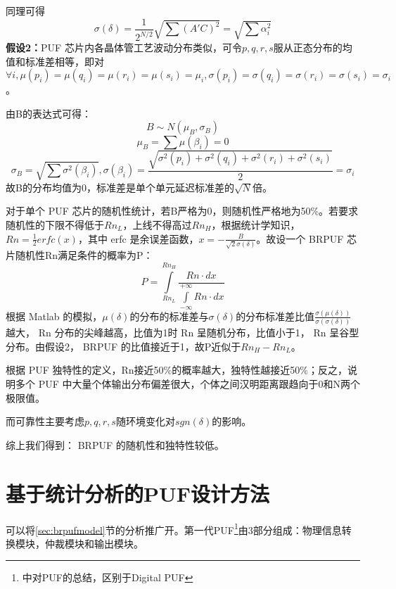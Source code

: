 同理可得
\begin{equation}
\sigma(\delta)=\frac{1}{2^{N/2}}\sqrt{\sum(A'C)^2}=\sqrt{\sum\alpha_i^2}
\end{equation}
\textbf{假设2：}PUF 芯片内各晶体管工艺波动分布类似，可令$ p,q,r,s $服从正态分布的均值和标准差相等，即对$ \forall i,\mu(p_i )=\mu(q_i )=\mu(r_i )=\mu(s_i )=\mu_i,\sigma(p_i )=\sigma(q_i )=\sigma(r_i )=\sigma(s_i )=\sigma_i $。

由B的表达式可得：
\begin{equation}
B\sim N(\mu_B,\sigma_B)
\end{equation}
\begin{equation}
\mu_B=\sum\mu(\beta_i)=0
\end{equation}
\begin{equation}
\sigma_B=\sqrt{\sum\sigma^2(\beta_i)},\sigma(\beta_i)=\dfrac{\sqrt{\sigma^2(p_i)+\sigma^2(q_i)+\sigma^2(r_i)+\sigma^2(s_i)}}{2}=\sigma_i
\end{equation}
故B的分布均值为0，标准差是单个单元延迟标准差的$ \sqrt{N} $倍。

对于单个 PUF 芯片的随机性统计，若B严格为0，则随机性严格地为50\%。若要求随机性的下限不得低于$ Rn_L $，上线不得高过$ Rn_H $，根据统计学知识，$ Rn=\frac{1}{2}erfc(x) $，其中 erfc 是余误差函数，$ x=-\frac{B}{\sqrt{2}\sigma(\delta)} $。故设一个 BRPUF 芯片随机性Rn满足条件的概率为P：
\begin{equation}
P=\int\limits_{Rn_L}^{Rn_H}\dfrac{Rn\cdot dx}{\int\limits_{-\infty}^{+\infty}Rn\cdot dx}
\end{equation}
根据 Matlab 的模拟，$ \mu(\delta) $的分布的标准差与$ \sigma(\delta) $的分布标准差比值$ \frac{\sigma(\mu(\delta))}{\sigma(\sigma(\delta))} $ 越大， Rn 分布的尖峰越高，比值为1时 Rn 呈随机分布，比值小于1， Rn 呈谷型分布。由假设2， BRPUF 的比值接近于1，故P近似于$ Rn_H-Rn_L $。

根据 PUF 独特性的定义，Rn接近50\%的概率越大，独特性越接近50\%；反之，说明多个 PUF 中大量个体输出分布偏差很大，个体之间汉明距离跟趋向于0和N两个极限值。

而可靠性主要考虑$ p,q,r,s $随环境变化对$ sgn(\delta) $的影响。

综上我们得到： BRPUF 的随机性和独特性较低。


\section{基于统计分析的PUF设计方法}
可以将\ref{sec:brpufmodel}节的分析推广开。第一代PUF\footnote{\parencite{rostami2014quo}中对PUF的总结，区别于Digital PUF}由3部分组成：物理信息转换模块，仲裁模块和输出模块。


